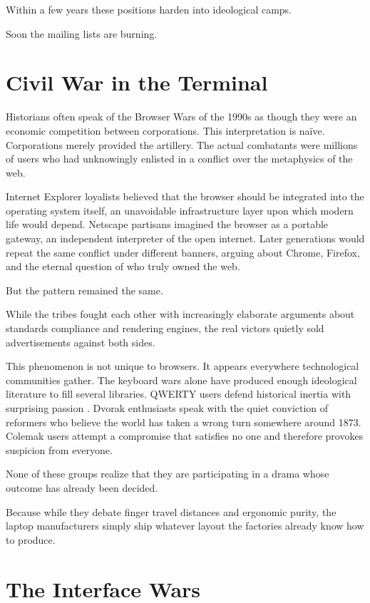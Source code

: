 \documentclass[11pt]{article}
\theoremstyle{definition}
\begin{document}
Within a few years these positions harden into ideological camps.

Soon the mailing lists are burning.

\section{Civil War in the Terminal}

Historians often speak of the Browser Wars of the 1990s as though they
were an economic competition between corporations. This interpretation
is naïve. Corporations merely provided the artillery. The actual
combatants were millions of users who had unknowingly enlisted in a
conflict over the metaphysics of the web.

Internet Explorer loyalists believed that the browser should be
integrated into the operating system itself, an unavoidable
infrastructure layer upon which modern life would depend. Netscape
partisans imagined the browser as a portable gateway, an independent
interpreter of the open internet. Later generations would repeat the
same conflict under different banners, arguing about Chrome, Firefox,
and the eternal question of who truly owned the web.

But the pattern remained the same.

While the tribes fought each other with increasingly elaborate arguments
about standards compliance and rendering engines, the real victors
quietly sold advertisements against both sides.

This phenomenon is not unique to browsers. It appears everywhere
technological communities gather. The keyboard wars alone have produced
enough ideological literature to fill several libraries. QWERTY users
defend historical inertia with surprising passion \cite{yamada1980}.
Dvorak enthusiasts speak with the quiet conviction of reformers who
believe the world has taken a wrong turn somewhere around 1873. Colemak
users attempt a compromise that satisfies no one and therefore provokes
suspicion from everyone.

None of these groups realize that they are participating in a drama whose
outcome has already been decided.

Because while they debate finger travel distances and ergonomic purity,
the laptop manufacturers simply ship whatever layout the factories
already know how to produce.

\section{The Interface Wars}
\end{document}
